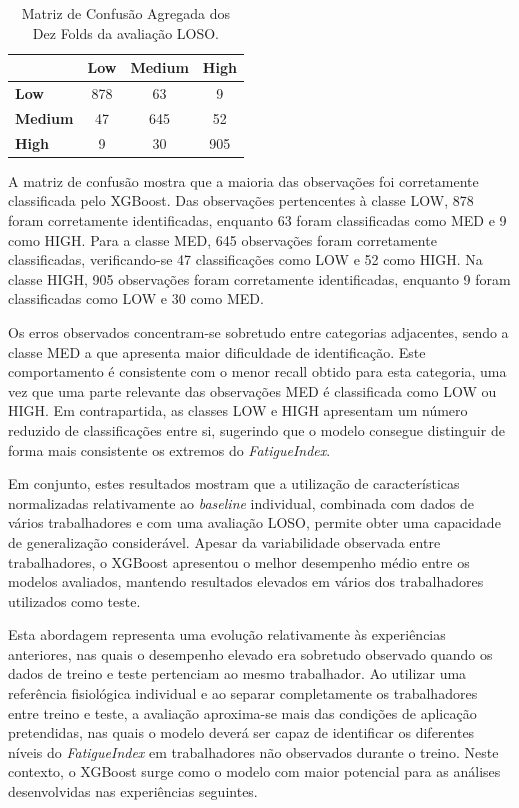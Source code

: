 \begin{table}[H]
\centering
\caption{Matriz de Confusão Agregada dos Dez Folds da avaliação LOSO.}
\label{tab:matriz_confusao_agregada_loso}
\begin{tabular}{l c c c}
\hline
 & \textbf{Low} & \textbf{Medium} & \textbf{High} \\
\hline
\textbf{Low} & 878 & 63 & 9 \\
\textbf{Medium} & 47 & 645 & 52 \\
\textbf{High} & 9 & 30 & 905 \\
\hline
\end{tabular}
\end{table}

A matriz de confusão mostra que a maioria das observações foi corretamente classificada pelo XGBoost. Das observações pertencentes à classe LOW, 878 foram corretamente identificadas, enquanto 63 foram classificadas como MED e 9 como HIGH. Para a classe MED, 645 observações foram corretamente classificadas, verificando-se 47 classificações como LOW e 52 como HIGH. Na classe HIGH, 905 observações foram corretamente identificadas, enquanto 9 foram classificadas como LOW e 30 como MED.

Os erros observados concentram-se sobretudo entre categorias adjacentes, sendo a classe MED a que apresenta maior dificuldade de identificação. Este comportamento é consistente com o menor recall obtido para esta categoria, uma vez que uma parte relevante das observações MED é classificada como LOW ou HIGH. Em contrapartida, as classes LOW e HIGH apresentam um número reduzido de classificações entre si, sugerindo que o modelo consegue distinguir de forma mais consistente os extremos do \textit{FatigueIndex}.

Em conjunto, estes resultados mostram que a utilização de características normalizadas relativamente ao \textit{baseline} individual, combinada com dados de vários trabalhadores e com uma avaliação LOSO, permite obter uma capacidade de generalização considerável. Apesar da variabilidade observada entre trabalhadores, o XGBoost apresentou o melhor desempenho médio entre os modelos avaliados, mantendo resultados elevados em vários dos trabalhadores utilizados como teste.

Esta abordagem representa uma evolução relativamente às experiências anteriores, nas quais o desempenho elevado era sobretudo observado quando os dados de treino e teste pertenciam ao mesmo trabalhador. Ao utilizar uma referência fisiológica individual e ao separar completamente os trabalhadores entre treino e teste, a avaliação aproxima-se mais das condições de aplicação pretendidas, nas quais o modelo deverá ser capaz de identificar os diferentes níveis do \textit{FatigueIndex} em trabalhadores não observados durante o treino. Neste contexto, o XGBoost surge como o modelo com maior potencial para as análises desenvolvidas nas experiências seguintes.

